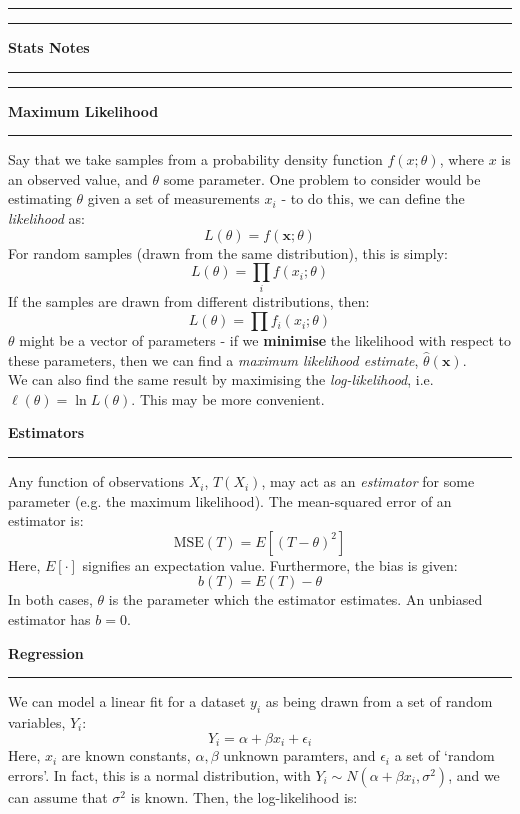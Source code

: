 \documentclass[12pt]{article}
\newcommand{\minisection}[1]{
    \par\vspace{0.25cm}
    \textbf{#1}\par
    \vspace{0.1cm}
    \hrule
    \vspace{0.25cm}
}
\newcommand{\doubleline}{
    \hrule
    \vspace*{0.05cm}
    \hrule
    \vspace*{0.25cm}
}
\begin{document}
    \doubleline
    \begin{center}
        \huge \textbf{Stats Notes} \label{Stats Notes}
    \end{center}
    \doubleline
    \minisection{Maximum Likelihood}
    Say that we take samples from a probability density function $f(x;\theta)$, where $x$ is an observed value, and $\theta$ some parameter. One problem to consider would be estimating $\theta$ given a set of measurements ${x_i}$ - to do this, we can define the \textit{likelihood} as:
    \begin{equation*}
        L(\theta) = f(\bm x;\theta)
    \end{equation*}
    For random samples (drawn from the same distribution), this is simply:
    \begin{equation*}
        L(\theta) = \prod_{i}f(x_i;\theta)
    \end{equation*}
    If the samples are drawn from different distributions, then:
    \begin{equation*}
        L(\theta) = \prod f_i(x_i;\theta)
    \end{equation*}
    $\theta$ might be a vector of parameters - if we \textbf{minimise} the likelihood with respect to these parameters, then we can find a \textit{maximum likelihood estimate}, $\hat\theta(\bm x)$.\\
    We can also find the same result by maximising the \textit{log-likelihood}, i.e. $\ell(\theta)=\ln L(\theta)$. This may be more convenient.
    \minisection{Estimators}
    Any function of observations $X_i$, $T(X_i)$, may act as an \textit{estimator} for some parameter (e.g. the maximum likelihood). The mean-squared error of an estimator is:
    \begin{equation*}
        \text{MSE}(T) = E[(T-\theta)^2]
    \end{equation*}
    Here, $E[\cdot]$ signifies an expectation value. Furthermore, the bias is given:
    \begin{equation*}
        b(T) = E(T) - \theta
    \end{equation*}
    In both cases, $\theta$ is the parameter which the estimator estimates. An unbiased estimator has $b=0$.
    \minisection{Regression}
    We can model a linear fit for a dataset $y_i$ as being drawn from a set of random variables, $Y_i$:
    \begin{equation*}
        Y_i = \alpha + \beta x_i + \epsilon_i
    \end{equation*}
    Here, $x_i$ are known constants, $\alpha,\beta$ unknown paramters, and $\epsilon_i$ a set of `random errors'. In fact, this is a normal distribution, with $Y_i\sim N(\alpha+\beta x_i,\sigma^2)$, and we can assume that $\sigma^2$ is known. Then, the log-likelihood is:
\end{document}
